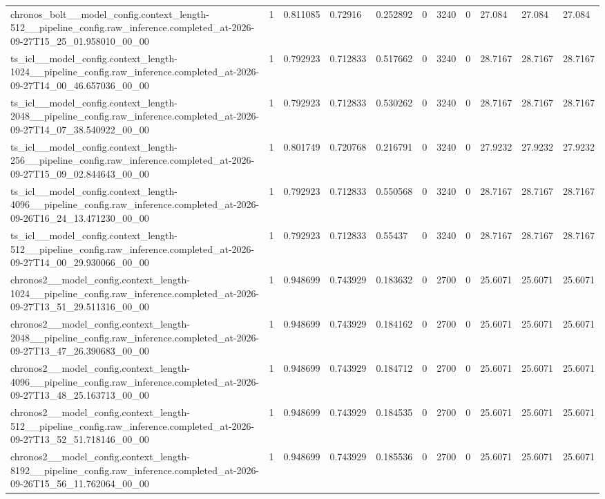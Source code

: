 \begin{tabular}{lllllllllll}
chronos\_bolt\_\_model\_config.context\_length-512\_\_pipeline\_config.raw\_inference.completed\_at-2026-09-27T15\_25\_01.958010\_00\_00 & 1 & 0.811085 & 0.72916 & 0.252892 & 0 & 3240 & 0 & 27.084 & 27.084 & 27.084 \\
ts\_icl\_\_model\_config.context\_length-1024\_\_pipeline\_config.raw\_inference.completed\_at-2026-09-27T14\_00\_46.657036\_00\_00 & 1 & 0.792923 & 0.712833 & 0.517662 & 0 & 3240 & 0 & 28.7167 & 28.7167 & 28.7167 \\
ts\_icl\_\_model\_config.context\_length-2048\_\_pipeline\_config.raw\_inference.completed\_at-2026-09-27T14\_07\_38.540922\_00\_00 & 1 & 0.792923 & 0.712833 & 0.530262 & 0 & 3240 & 0 & 28.7167 & 28.7167 & 28.7167 \\
ts\_icl\_\_model\_config.context\_length-256\_\_pipeline\_config.raw\_inference.completed\_at-2026-09-27T15\_09\_02.844643\_00\_00 & 1 & 0.801749 & 0.720768 & 0.216791 & 0 & 3240 & 0 & 27.9232 & 27.9232 & 27.9232 \\
ts\_icl\_\_model\_config.context\_length-4096\_\_pipeline\_config.raw\_inference.completed\_at-2026-09-26T16\_24\_13.471230\_00\_00 & 1 & 0.792923 & 0.712833 & 0.550568 & 0 & 3240 & 0 & 28.7167 & 28.7167 & 28.7167 \\
ts\_icl\_\_model\_config.context\_length-512\_\_pipeline\_config.raw\_inference.completed\_at-2026-09-27T14\_00\_29.930066\_00\_00 & 1 & 0.792923 & 0.712833 & 0.55437 & 0 & 3240 & 0 & 28.7167 & 28.7167 & 28.7167 \\
chronos2\_\_model\_config.context\_length-1024\_\_pipeline\_config.raw\_inference.completed\_at-2026-09-27T13\_51\_29.511316\_00\_00 & 1 & 0.948699 & 0.743929 & 0.183632 & 0 & 2700 & 0 & 25.6071 & 25.6071 & 25.6071 \\
chronos2\_\_model\_config.context\_length-2048\_\_pipeline\_config.raw\_inference.completed\_at-2026-09-27T13\_47\_26.390683\_00\_00 & 1 & 0.948699 & 0.743929 & 0.184162 & 0 & 2700 & 0 & 25.6071 & 25.6071 & 25.6071 \\
chronos2\_\_model\_config.context\_length-4096\_\_pipeline\_config.raw\_inference.completed\_at-2026-09-27T13\_48\_25.163713\_00\_00 & 1 & 0.948699 & 0.743929 & 0.184712 & 0 & 2700 & 0 & 25.6071 & 25.6071 & 25.6071 \\
chronos2\_\_model\_config.context\_length-512\_\_pipeline\_config.raw\_inference.completed\_at-2026-09-27T13\_52\_51.718146\_00\_00 & 1 & 0.948699 & 0.743929 & 0.184535 & 0 & 2700 & 0 & 25.6071 & 25.6071 & 25.6071 \\
chronos2\_\_model\_config.context\_length-8192\_\_pipeline\_config.raw\_inference.completed\_at-2026-09-26T15\_56\_11.762064\_00\_00 & 1 & 0.948699 & 0.743929 & 0.185536 & 0 & 2700 & 0 & 25.6071 & 25.6071 & 25.6071 \\

\end{tabular}
